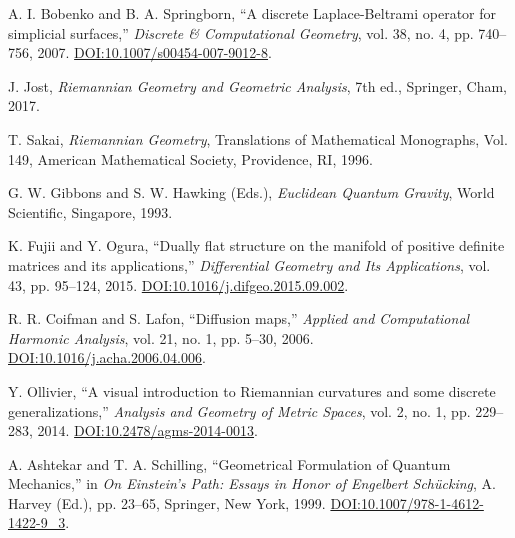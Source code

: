 \documentclass[twoside,twocolumn]{article}
\begin{document}
\begin{thebibliography}{99}
A. I. Bobenko and B. A. Springborn,
``A discrete Laplace-Beltrami operator for simplicial surfaces,''
\textit{Discrete \& Computational Geometry}, vol. 38, no. 4, pp. 740--756, 2007. %
\href{https://doi.org/10.1007/s00454-007-9012-8}{DOI:10.1007/s00454-007-9012-8}.


J. Jost,
\textit{Riemannian Geometry and Geometric Analysis},
7th ed., Springer, Cham, 2017. %

T. Sakai,
\textit{Riemannian Geometry},
Translations of Mathematical Monographs, Vol. 149, American Mathematical Society, Providence, RI, 1996.

G. W. Gibbons and S. W. Hawking (Eds.), %
\textit{Euclidean Quantum Gravity},
World Scientific, Singapore, 1993.

K. Fujii and Y. Ogura,
``Dually flat structure on the manifold of positive definite matrices and its applications,''
\textit{Differential Geometry and Its Applications}, vol. 43, pp. 95--124, 2015.
\href{https://doi.org/10.1016/j.difgeo.2015.09.002}{DOI:10.1016/j.difgeo.2015.09.002}.

R. R. Coifman and S. Lafon,
``Diffusion maps,''
\textit{Applied and Computational Harmonic Analysis}, vol. 21, no. 1, pp. 5--30, 2006.
\href{https://doi.org/10.1016/j.acha.2006.04.006}{DOI:10.1016/j.acha.2006.04.006}.

Y. Ollivier,
``A visual introduction to Riemannian curvatures and some discrete generalizations,''
\textit{Analysis and Geometry of Metric Spaces}, vol. 2, no. 1, pp. 229--283, 2014. %
\href{https://doi.org/10.2478/agms-2014-0013}{DOI:10.2478/agms-2014-0013}.

A. Ashtekar and T. A. Schilling,
``Geometrical Formulation of Quantum Mechanics,''
in \textit{On Einstein's Path: Essays in Honor of Engelbert Sch\"ucking}, A. Harvey (Ed.), pp. 23--65, Springer, New York, 1999. %
\href{https://doi.org/10.1007/978-1-4612-1422-9_3}{DOI:10.1007/978-1-4612-1422-9\_3}. %



\end{thebibliography}
\end{document}
